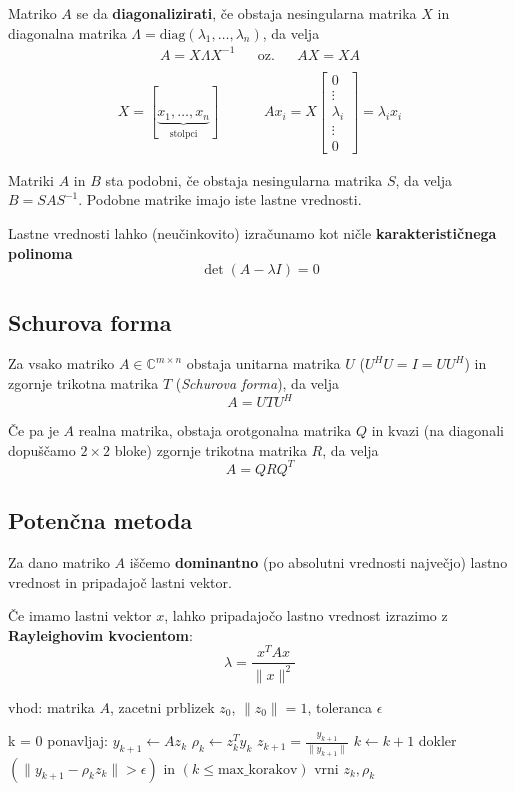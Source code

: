 \begin{multicols}{5}
Matriko $A$ se da \textbf{diagonalizirati}, če obstaja nesingularna matrika $X$ in diagonalna matrika $\Lambda = \text{diag}(\lambda_1, \dots, \lambda_n) $, 
da velja
\begin{align*}
    A = X\Lambda X^{-1} && \text{oz.} && AX = XA \\
\end{align*}
\begin{align*}
X = [\underbrace{x_1, \dots, x_n}_{\text{stolpci}}] && && Ax_i = X\begin{bmatrix}
    0 \\
    \vdots\\
    \lambda_i \\
    \vdots \\
    0
\end{bmatrix}
= \lambda_i x_i
\end{align*}

Matriki $A$ in $B$ sta podobni, če obstaja nesingularna matrika $S$, da velja $B = SAS^{-1}$.
Podobne matrike imajo iste lastne vrednosti.

Lastne vrednosti lahko (neučinkovito) izračunamo kot ničle \textbf{karakterističnega polinoma}
\[\det (A-\lambda I) = 0\] 

\subsection*{Schurova forma}
Za vsako matriko $A \in \mathbb{C}^{m\times n}$ obstaja unitarna matrika $U$ ($U^HU = I = UU^H$) 
in zgornje trikotna matrika $T$ (\textit{Schurova forma}), da velja
\[ A = UTU^H \]

Če pa je $A$ realna matrika, obstaja orotgonalna matrika $Q$ in kvazi (na diagonali dopuščamo $2\times 2$ bloke) 
zgornje trikotna matrika $R$, da velja
\[ A = QRQ^T \]

\subsection*{Potenčna metoda}
Za dano matriko $A$ iščemo \textbf{dominantno} (po absolutni vrednosti največjo) lastno vrednost
in pripadajoč lastni vektor.

Če imamo lastni vektor $x$, lahko pripadajočo lastno vrednost izrazimo z \textbf{Rayleighovim kvocientom}:
\[ \lambda = \frac{x^T A x}{\| x \|^2}\]

\begin{koda}
vhod: matrika $A$, zacetni prblizek $z_0$, $\| z_0 \|=1$, toleranca $\epsilon$

k = 0
ponavljaj:
    $y_{k+1} \leftarrow A z_k$
    $\rho_k \leftarrow z_k^T y_k$
    $z_{k+1} = \frac{y_{k+1}}{\| y_{k+1} \|}$
    $k \leftarrow k + 1$
dokler $(\| y_{k+1} - \rho_k z_k \| > \epsilon )$ in $(k \leq \text{max\_korakov})$
vrni $z_k, \rho_k$
\end{koda}

\end{multicols}

